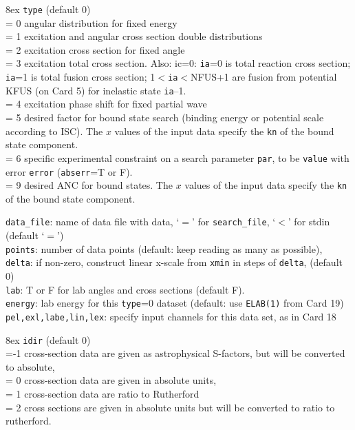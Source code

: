 \documentclass[11pt]{article}
\begin{document}
\hangindent 8ex
{\tt type} (default 0)
\\ = 0 angular distribution for fixed energy
\\ = 1 excitation and angular cross section double distributions
\\ = 2 excitation cross section for fixed angle
\\ = 3 excitation total cross section. Also: ic=0: {\tt ia}=0 is total reaction cross section;
{\tt ia}=1 is total fusion cross section; 1$<${\tt ia}$<$NFUS+1 are fusion from potential
KFUS (on Card 5) for inelastic state {\tt ia}--1.
\\ = 4 excitation phase shift for fixed partial wave
\\ = 5 desired factor for bound state search (binding energy or potential scale
 according to ISC). The $x$ values of the input data specify the {\tt kn} of the bound state component.
\\ = 6 specific experimental constraint on a search parameter {\tt par},
    to be {\tt value} with error {\tt error} ({\tt abserr}=T or F).
\\ = 9 desired ANC for bound states. The $x$ values of the input data specify the {\tt kn} of the bound state component.


{\tt data\_file}: name of data file with data, `$=$' for {\tt search\_file},
 `$<$' for stdin (default `$=$')\\
{\tt points}: number of data points (default: keep reading as many as possible),
\\
{\tt delta}: if non-zero, construct linear x-scale from {\tt xmin} in steps of {\tt delta},
 (default 0)\\
{\tt lab}: T or F for lab angles and cross sections (default F).\\
{\tt energy}: lab energy for this {\tt type}=0 dataset (default: use {\tt ELAB(1)} from Card 19)\\
{\tt pel,exl,labe,lin,lex}: specify input channels for this data set, as in Card 18

\hangindent 8ex
{\tt idir} (default 0)
\\ =-1 cross-section data are given as astrophysical S-factors, but will be converted to absolute,
\\ = 0 cross-section data are given in absolute units,
\\ = 1 cross-section data are ratio to Rutherford
\\ = 2 cross sections are given in absolute units but will be
         converted to ratio to rutherford.
\end{document}
